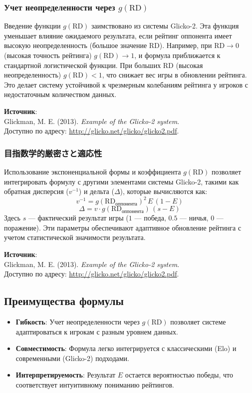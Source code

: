 \documentclass[12pt]{article}
\begin{document}
\subsubsection*{Учет неопределенности через \(g(\text{RD})\)}
Введение функции \(g(\text{RD})\) заимствовано из системы Glicko-2. Эта функция уменьшает влияние ожидаемого результата, если рейтинг оппонента имеет высокую неопределенность (большое значение RD). Например, при \(\text{RD} \to 0\) (высокая точность рейтинга) \(g(\text{RD}) \to 1\), и формула приближается к стандартной логистической функции. При больших \(\text{RD}\) (высокая неопределенность) \(g(\text{RD}) < 1\), что снижает вес игры в обновлении рейтинга. Это делает систему устойчивой к чрезмерным колебаниям рейтинга у игроков с недостаточным количеством данных.

\textbf{Источник}: \\
Glickman, M. E. (2013). \textit{Example of the Glicko-2 system}. \\
Доступно по адресу: \url{http://glicko.net/glicko/glicko2.pdf}.

\subsubsection*{目指数学的厳密さと適応性}
Использование экспоненциальной формы и коэффициента \(g(\text{RD})\) позволяет интегрировать формулу с другими элементами системы Glicko-2, такими как обратная дисперсия (\(v^{-1}\)) и дельта (\(\Delta\)), которые вычисляются как:
\[
v^{-1} = g(\text{RD}_{\text{оппонента}})^2 \, E \, (1 - E)
\]
\[
\Delta = v \cdot g(\text{RD}_{\text{оппонента}}) \, (s - E)
\]
Здесь \(s\) --- фактический результат игры (\(1\) --- победа, \(0.5\) --- ничья, \(0\) --- поражение). Эти параметры обеспечивают адаптивное обновление рейтинга с учетом статистической значимости результата.

\textbf{Источник}: \\
Glickman, M. E. (2013). \textit{Example of the Glicko-2 system}. \\
Доступно по адресу: \url{http://glicko.net/glicko/glicko2.pdf}.

\subsection*{Преимущества формулы}
\begin{itemize}
    \item \textbf{Гибкость}: Учет неопределенности через \(g(\text{RD})\) позволяет системе адаптироваться к игрокам с разным уровнем данных.
    \item \textbf{Совместимость}: Формула легко интегрируется с классическими (Elo) и современными (Glicko-2) подходами.
    \item \textbf{Интерпретируемость}: Результат \(E\) остается вероятностью победы, что соответствует интуитивному пониманию рейтингов.
\end{itemize}
\end{document}
